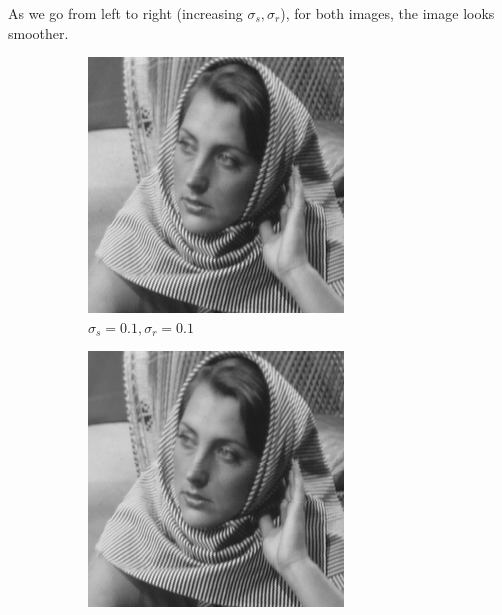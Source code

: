 \documentclass[a4paper, landscape]{article}
\begin{document}
As we go from left to right (increasing $\sigma_s, \sigma_r$), for both images, the image looks smoother.
\begin{figure}
    \centering
    \begin{subfigure}{0.33\linewidth}
        \centering
        \includegraphics[width=\linewidth]{barbara256,σ_spatial0.1,σ_range0.1.png}
        \caption{$\sigma_s=0.1, \sigma_r=0.1$}
    \end{subfigure}
    \begin{subfigure}{0.33\linewidth}
        \centering
        \includegraphics[width=\linewidth]{barbara256,σ_spatial2,σ_range2.png}

\end{subfigure}
\end{figure}
\end{document}
